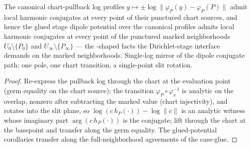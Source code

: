 \begin{lemma}
\label{lem:stage-log-profile-off-point-conjugates}
The canonical chart-pullback log profiles
\(y \mapsto \pm\log\lVert\varphi_P(y) - \varphi_P(P)\rVert\) admit local
harmonic conjugates at every point of their punctured chart sources, and
hence the glued stage dipole potential over the canonical profiles admits
local harmonic conjugates at every point of the punctured marked
neighborhoods \(U_0 \setminus \{P_0\}\) and
\(U_\infty \setminus \{P_\infty\}\) — the
-shaped facts the Dirichlet-stage interface
demands on the marked neighborhoods.  Single-log mirror of the dipole
conjugate path: one pole, one chart transition, a single-point slit
rotation.
\leanok
\end{lemma}
\begin{proof}\leanok
Re-express the pullback log through the chart at the evaluation point
(germ equality on the chart source); the transition
\(\varphi_P \circ \varphi_x^{-1}\) is analytic on the overlap, nonzero
after subtracting the marked value (chart injectivity), and rotates into
the slit plane, so \(\log(c\,h_P(\cdot)) - \log\lVert c\rVert\) is an
analytic witness whose imaginary part \(\arg(c\,h_P(\cdot))\) is the
conjugate; lift through the chart at the basepoint and transfer along the
germ equality.  The glued-potential corollaries transfer along the
full-neighborhood agreements of the case-glue.
\end{proof}

